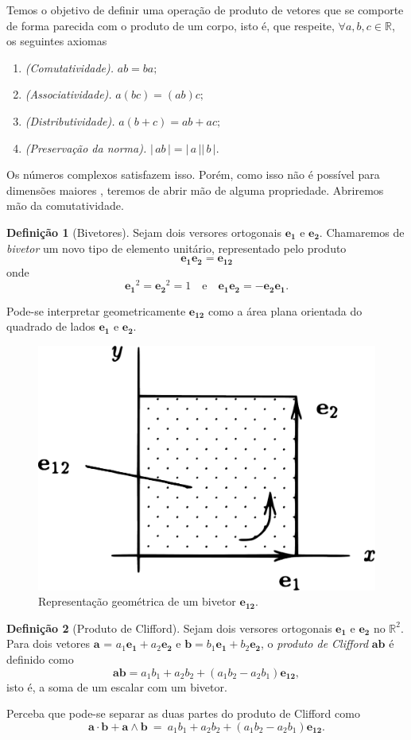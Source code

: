 \documentclass[a4paper,12pt]{report}
\theoremstyle{plain}
\theoremstyle{definition}
\newtheorem{definicao}{Definição}[section]
\begin{document}
Temos o objetivo de definir uma operação de produto de vetores que se comporte de forma parecida com o produto de um corpo, isto é, que respeite, $\forall a,b,c \in \mathbb{R}$, os seguintes axiomas
\begin{enumerate}
	\item \emph{(Comutatividade).} $ab = ba;$
	\item \emph{(Associatividade).} $a(bc)=(ab)c;$
	\item \emph{(Distributividade).} $a(b+c)=ab+ac;$
	\item \emph{(Preservação da norma).} $|\,ab\,| = |\,a\,||\,b\,|.$
\end{enumerate}

Os números complexos satisfazem isso. Porém, como isso não é possível para dimensões maiores \cite{lounestoClifford}, teremos de abrir mão de alguma propriedade. Abriremos mão da comutatividade.

\begin{definicao}[Bivetores]
	Sejam dois versores ortogonais $\mathbf{e_1}$ e $\mathbf{e_2}$. Chamaremos de \emph{bivetor} um novo tipo de elemento unitário, representado pelo produto $$\mathbf{e_1e_2} = \mathbf{e_{12}}$$ onde $$\mathbf{e_1}^2 = \mathbf{e_2}^2 = 1 \quad \text{e} \quad \mathbf{e_1e_2} = -\mathbf{e_2e_1}.$$
\end{definicao}

Pode-se interpretar geometricamente $\mathbf{e_{12}}$ como a área plana orientada do quadrado de lados $\mathbf{e_1}$ e $\mathbf{e_2}$.

\begin{figure}[H]
	\begin{center}
		\includegraphics[width=0.4\linewidth]{figures/bivector.pdf}
	\end{center}
	\caption{Representação geométrica de um bivetor $\mathbf{e_{12}}$.}
\end{figure}

\begin{definicao}[Produto de Clifford]
	Sejam dois versores ortogonais $\mathbf{e_1}$ e $\mathbf{e_2}$ no $\mathbb{R}^2$. Para dois vetores $\mathbf{a}$ = $a_1\mathbf{e_1} + a_2\mathbf{e_2}$ e $\mathbf b = b_1\mathbf{e_1} + b_2\mathbf{e_2}$, o \emph{produto de Clifford} $\mathbf{ab}$ é definido como $$\mathbf{ab} = a_1b_1 + a_2b_2 + (a_1b_2-a_2b_1)\mathbf{e_{12}},$$
	isto é, a soma de um escalar com um bivetor.
\end{definicao}



Perceba que pode-se separar as duas partes do produto de Clifford como $$\mathbf{a\cdot b} + \mathbf{a \wedge b} \ = \ a_1b_1 + a_2b_2 + (a_1b_2 - a_2b_1)\mathbf{e_{12}}.$$
{}



\end{document}
